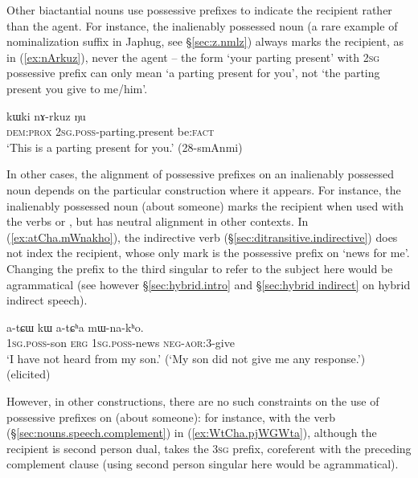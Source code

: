 Other biactantial nouns use possessive prefixes to indicate the recipient rather than the agent. For instance, the inalienably possessed noun  (a rare example of  nominalization suffix in Japhug, see §\ref{sec:z.nmlz}) always marks the recipient, as in (\ref{ex:nArkuz}), never the agent -- the form  `your parting present' with \textsc{2sg} possessive prefix can only mean `a parting present for you', not `the parting present you give to me/him'.

\begin{exe}
\ex \label{ex:nArkuz}
\gll kɯki nɤ-rkuz ŋu \\
\textsc{dem}:\textsc{prox} \textsc{2sg}.\textsc{poss}-parting.present be:\textsc{fact} \\
\glt `This is a parting present for you.' (28-smAnmi) 
\end{exe}

In other cases, the alignment of possessive prefixes on an inalienably possessed noun depends on the particular construction where it appears. For instance, the inalienably possessed noun  (about someone) marks the recipient when used with the verbs  or , but has neutral alignment in other contexts. In (\ref{ex:atCha.mWnakho}), the indirective verb  (§\ref{sec:ditransitive.indirective}) does not index the recipient, whose only mark is the possessive prefix on  `news for me'. Changing the prefix to the third singular  to refer to the subject here would be agrammatical (see however §\ref{sec:hybrid.intro} and §\ref{sec:hybrid indirect} on hybrid indirect speech).


\begin{exe}
\ex \label{ex:atCha.mWnakho}
\gll a-tɕɯ kɯ a-tɕʰa mɯ-na-kʰo. \\
\textsc{1sg}.\textsc{poss}-son \textsc{erg} \textsc{1sg}.\textsc{poss}-news \textsc{neg}-\textsc{aor}:3\flobv{}-give \\
\glt `I have not heard from my son.' (`My son did not give me any response.') (elicited)
\end{exe}

However, in other constructions, there are no such constraints on the use of possessive prefixes on (about someone): for instance, with the verb  (§\ref{sec:nouns.speech.complement}) in (\ref{ex:WtCha.pjWGWta}), although the recipient is second person dual,  takes the \textsc{3sg} prefix, coreferent with the preceding complement clause (using second person singular  here would be agrammatical).

